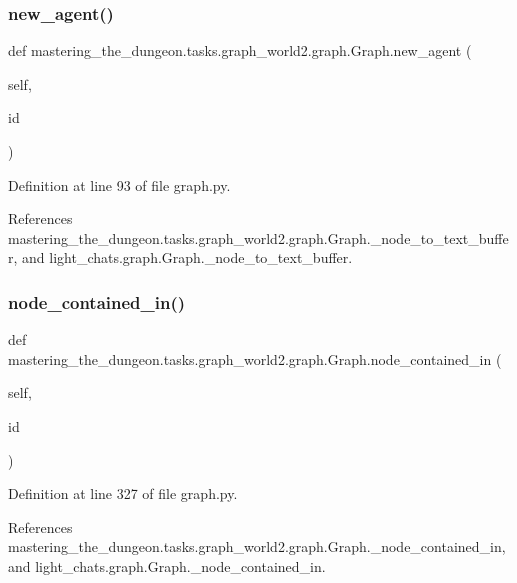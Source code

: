 \subsubsection{\texorpdfstring{new\+\_\+agent()}{new\_agent()}}
{\footnotesize\ttfamily def mastering\+\_\+the\+\_\+dungeon.\+tasks.\+graph\+\_\+world2.\+graph.\+Graph.\+new\+\_\+agent (\begin{DoxyParamCaption}\item[{}]{self,  }\item[{}]{id }\end{DoxyParamCaption})}



Definition at line 93 of file graph.\+py.



References mastering\+\_\+the\+\_\+dungeon.\+tasks.\+graph\+\_\+world2.\+graph.\+Graph.\+\_\+node\+\_\+to\+\_\+text\+\_\+buffer, and light\+\_\+chats.\+graph.\+Graph.\+\_\+node\+\_\+to\+\_\+text\+\_\+buffer.

\mbox{\label{classmastering__the__dungeon_1_1tasks_1_1graph__world2_1_1graph_1_1Graph_ad7537af58a534364e66ca5f22391d883}} 
\subsubsection{\texorpdfstring{node\+\_\+contained\+\_\+in()}{node\_contained\_in()}}
{\footnotesize\ttfamily def mastering\+\_\+the\+\_\+dungeon.\+tasks.\+graph\+\_\+world2.\+graph.\+Graph.\+node\+\_\+contained\+\_\+in (\begin{DoxyParamCaption}\item[{}]{self,  }\item[{}]{id }\end{DoxyParamCaption})}



Definition at line 327 of file graph.\+py.



References mastering\+\_\+the\+\_\+dungeon.\+tasks.\+graph\+\_\+world2.\+graph.\+Graph.\+\_\+node\+\_\+contained\+\_\+in, and light\+\_\+chats.\+graph.\+Graph.\+\_\+node\+\_\+contained\+\_\+in.



